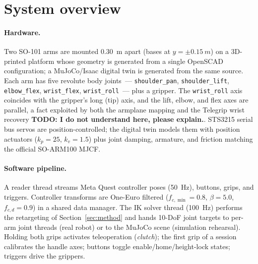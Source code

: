 \section{System overview}
\label{sec:system}

\paragraph{Hardware.}
Two SO-101 arms are mounted \SI{0.30}{m} apart (bases at
\(y=\pm\SI{0.15}{m}\)) on a 3D-printed platform whose geometry is generated
from a single OpenSCAD configuration; a MuJoCo/Isaac digital twin is
generated from the same source. Each arm has five revolute body joints~---
\texttt{shoulder\_pan}, \texttt{shoulder\_lift}, \texttt{elbow\_flex},
\texttt{wrist\_flex}, \texttt{wrist\_roll}~--- plus a gripper. The
\texttt{wrist\_roll} axis coincides with the gripper's long (tip) axis, and
the lift, elbow, and flex axes are parallel, a fact exploited by both the
armplane mapping and the Telegrip wrist recovery \textbf{TODO: I do not understand here, please explain.}. STS3215 serial bus servos
are position-controlled; the digital twin models them with position
actuators (\(k_p=25\), \(k_v=1.5\)) plus joint damping, armature, and
friction matching the official SO-ARM100 MJCF.

\paragraph{Software pipeline.}
A reader thread streams Meta Quest controller poses (\SI{50}{Hz}), buttons,
grips, and triggers. Controller transforms are One-Euro filtered
(\(f_{c,\min}=0.8\), \(\beta=5.0\), \(f_{c,d}=0.9\)) in a shared data
manager. The IK solver thread (\SI{100}{Hz}) performs the retargeting of
Section~\ref{sec:method} and hands 10-DoF joint targets to per-arm joint
threads (real robot) or to the MuJoCo scene (simulation rehearsal). Holding
both grips activates teleoperation (\emph{clutch}); the first grip of a
session calibrates the handle axes; buttons toggle enable/home/height-lock
states; triggers drive the grippers.

